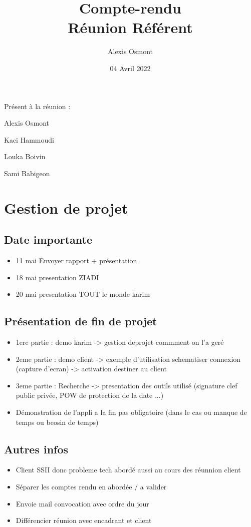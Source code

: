 \documentclass{article}
\title{
    \Huge
    Compte-rendu\\
    Réunion Référent\\
}
\date{\huge 04 Avril 2022}
\author{\huge Alexis Osmont\\}
\begin{document}
\maketitle
\vspace{5cm}
    Présent à la réunion :
    \begin{description}
        \item Alexis Osmont
        \item Kaci Hammoudi
        \item Louka Boivin
        \item Sami Babigeon
    \end{description}
\newpage

\section{Gestion de projet}
\subsection{Date importante}

\begin{itemize}
    \item 11 mai Envoyer rapport + présentation
    \item 18 mai presentation ZIADI
    \item 20 mai presentation TOUT le monde karim
\end{itemize}

\subsection{Présentation de fin de projet}

\begin{itemize}
    \item 1ere partie : demo karim -> gestion deprojet commment on l'a geré
    \item 2eme partie : demo client -> exemple d'utilisation schematiser connexion (capture d'ecran) -> activation destiner au client
    \item 3eme partie : Recherche -> presentation des outils utilisé (signature clef public privée, POW de protection de la date ...)
    \item Démonstration de l'appli a la fin pas obligatoire (dans le cas ou manque de temps ou beosin de temps) 
\end{itemize}

\subsection{Autres infos}

\begin{itemize}
    \item Client SSII donc probleme tech abordé aussi au cours des réunnion client
    \item Séparer les comptes rendu en abordée / a valider
    \item Envoie mail convocation avec ordre du jour
    \item Différencier réunion avec encadrant et client
\end{itemize}
\end{document}
